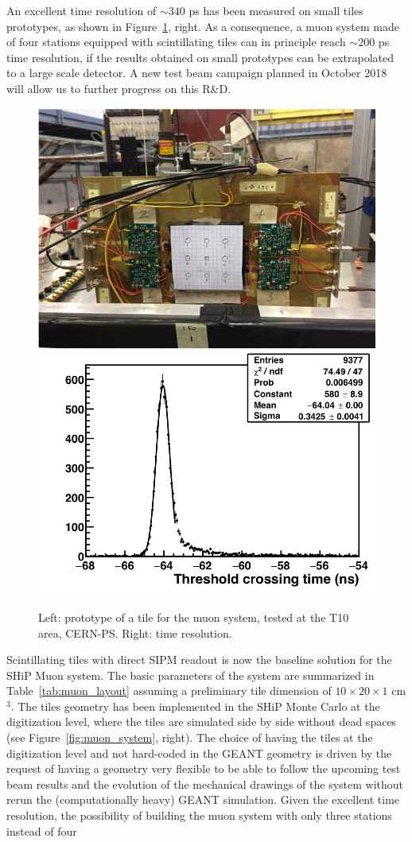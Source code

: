 An excellent time resolution of $\sim 340$ ps has been measured on
small tiles prototypes, as shown in Figure~\ref{fig:tile}, right. As a consequence,
a muon system made of four stations equipped with scintillating tiles can in principle reach $\sim 200$ ps time resolution,
if the results obtained on small prototypes can be extrapolated to a large scale detector.
A new test beam campaign planned in October 2018 will allow us to further progress on this R\&D.
%
\begin{figure}[htb]
\centering
\includegraphics[width=0.45\columnwidth]{figs/DecaySpectrometer/tile_on_TB.png}
\includegraphics[width=0.45\columnwidth]{figs/DecaySpectrometer/time_reso.png}
\caption{Left: prototype of a tile for the muon system, tested at the T10 area, CERN-PS.
  Right: time resolution.}
\label{fig:tile}
\end{figure}
%
Scintillating tiles with direct SIPM readout is now the baseline solution for the SHiP Muon system.
The basic parameters of the system are summarized in Table~\ref{tab:muon_layout} assuming a preliminary tile dimension
of $10\times20\times1$ cm$^3$. The tiles geometry has been implemented in the SHiP Monte Carlo
at the digitization level, where the tiles are simulated side by side without dead spaces (see Figure~\ref{fig:muon_system}, right).
The choice of having the tiles at the digitization level and not hard-coded in the GEANT geometry
is driven by the request of having a geometry very flexible to be able to follow the upcoming test beam
results and the  evolution of the mechanical drawings of the system without rerun the (computationally heavy) GEANT simulation.
Given the excellent time resolution, the possibility of building the muon system with only three stations instead of four
